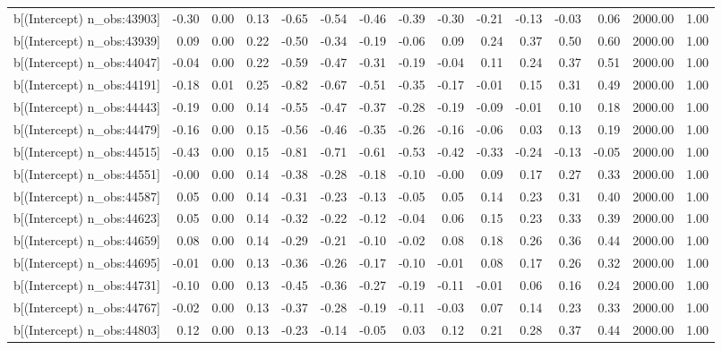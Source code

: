 \begin{table}[ht]
\begin{tabular}{rrrrrrrrrrrrrrr}
  b[(Intercept) n\_obs:43903] & -0.30 & 0.00 & 0.13 & -0.65 & -0.54 & -0.46 & -0.39 & -0.30 & -0.21 & -0.13 & -0.03 & 0.06 & 2000.00 & 1.00 \\ 
  b[(Intercept) n\_obs:43939] & 0.09 & 0.00 & 0.22 & -0.50 & -0.34 & -0.19 & -0.06 & 0.09 & 0.24 & 0.37 & 0.50 & 0.60 & 2000.00 & 1.00 \\ 
  b[(Intercept) n\_obs:44047] & -0.04 & 0.00 & 0.22 & -0.59 & -0.47 & -0.31 & -0.19 & -0.04 & 0.11 & 0.24 & 0.37 & 0.51 & 2000.00 & 1.00 \\ 
  b[(Intercept) n\_obs:44191] & -0.18 & 0.01 & 0.25 & -0.82 & -0.67 & -0.51 & -0.35 & -0.17 & -0.01 & 0.15 & 0.31 & 0.49 & 2000.00 & 1.00 \\ 
  b[(Intercept) n\_obs:44443] & -0.19 & 0.00 & 0.14 & -0.55 & -0.47 & -0.37 & -0.28 & -0.19 & -0.09 & -0.01 & 0.10 & 0.18 & 2000.00 & 1.00 \\ 
  b[(Intercept) n\_obs:44479] & -0.16 & 0.00 & 0.15 & -0.56 & -0.46 & -0.35 & -0.26 & -0.16 & -0.06 & 0.03 & 0.13 & 0.19 & 2000.00 & 1.00 \\ 
  b[(Intercept) n\_obs:44515] & -0.43 & 0.00 & 0.15 & -0.81 & -0.71 & -0.61 & -0.53 & -0.42 & -0.33 & -0.24 & -0.13 & -0.05 & 2000.00 & 1.00 \\ 
  b[(Intercept) n\_obs:44551] & -0.00 & 0.00 & 0.14 & -0.38 & -0.28 & -0.18 & -0.10 & -0.00 & 0.09 & 0.17 & 0.27 & 0.33 & 2000.00 & 1.00 \\ 
  b[(Intercept) n\_obs:44587] & 0.05 & 0.00 & 0.14 & -0.31 & -0.23 & -0.13 & -0.05 & 0.05 & 0.14 & 0.23 & 0.31 & 0.40 & 2000.00 & 1.00 \\ 
  b[(Intercept) n\_obs:44623] & 0.05 & 0.00 & 0.14 & -0.32 & -0.22 & -0.12 & -0.04 & 0.06 & 0.15 & 0.23 & 0.33 & 0.39 & 2000.00 & 1.00 \\ 
  b[(Intercept) n\_obs:44659] & 0.08 & 0.00 & 0.14 & -0.29 & -0.21 & -0.10 & -0.02 & 0.08 & 0.18 & 0.26 & 0.36 & 0.44 & 2000.00 & 1.00 \\ 
  b[(Intercept) n\_obs:44695] & -0.01 & 0.00 & 0.13 & -0.36 & -0.26 & -0.17 & -0.10 & -0.01 & 0.08 & 0.17 & 0.26 & 0.32 & 2000.00 & 1.00 \\ 
  b[(Intercept) n\_obs:44731] & -0.10 & 0.00 & 0.13 & -0.45 & -0.36 & -0.27 & -0.19 & -0.11 & -0.01 & 0.06 & 0.16 & 0.24 & 2000.00 & 1.00 \\ 
  b[(Intercept) n\_obs:44767] & -0.02 & 0.00 & 0.13 & -0.37 & -0.28 & -0.19 & -0.11 & -0.03 & 0.07 & 0.14 & 0.23 & 0.33 & 2000.00 & 1.00 \\ 
  b[(Intercept) n\_obs:44803] & 0.12 & 0.00 & 0.13 & -0.23 & -0.14 & -0.05 & 0.03 & 0.12 & 0.21 & 0.28 & 0.37 & 0.44 & 2000.00 & 1.00 \\ 

\end{tabular}
\end{table}
